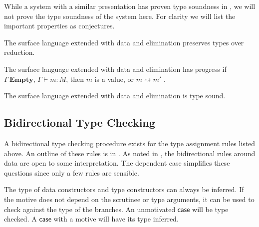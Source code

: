 While a system with a similar presentation has proven type soundness in \cite{sjoberg2012irrelevance}, we will not prove the type soundness of the system here.
For clarity we will list the important properties as conjectures.
\begin{conjecture}
The surface language extended with data and elimination preserves types over reduction.
\end{conjecture}

\begin{conjecture}
The surface language extended with data and elimination has progress
if $\Gamma\,\mathbf{Empty}$, \textup{$\Gamma\vdash m:M$}, then $m$
is a value, or $m\rightsquigarrow m'$ .
\end{conjecture}

\begin{conjecture}
The surface language extended with data and elimination is type sound.
\end{conjecture}


\subsection{Bidirectional Type Checking}

A bidirectional type checking procedure exists for the type assignment rules listed above.
An outline of these rules is in .
As noted in \cite{10.1145/3450952}, the bidirectional rules around data are open to some interpretation.
The dependent case simplifies these questions since only a few rules are sensible.

The type of data constructors and type constructors can always be inferred.
If the motive does not depend on the scrutinee or type arguments, it can be used to check against the type of the branches.
An unmotivated $\mathsf{case}$ will be type checked.
A $\mathsf{case}$ with a motive will have its type inferred.

